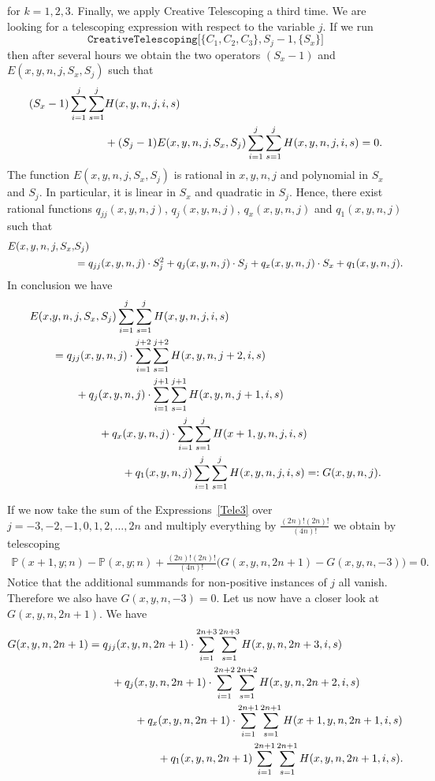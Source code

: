\documentclass{amsart}
\numberwithin{equation}{section}
\begin{document}
for $k=1,2,3$. Finally, we apply Creative Telescoping a third time. We are looking for a telescoping expression with respect to the variable $j$. If we run
\[\texttt{CreativeTelescoping[}\{C_1,C_2,C_3\},S_j-1,\{S_x\}\texttt{]}\]
then after several hours we obtain the two operators $(S_x-1)$ and $E(x,y,n,j,S_x,S_j)$ such that
\begin{align}
    (S_x-1)\sum_{i=1}^j\sum_{s=1}^j &H(x,y,n,j,i,s)\notag\\
    &+(S_j-1)E(x,y,n,j,S_x,S_j)\sum_{i=1}^j\sum_{s=1}^j H(x,y,n,j,i,s)=0. \label{Tele3}
\end{align}
The function $E(x,y,n,j,S_x,S_j)$ is rational in $x,y,n,j$ and polynomial in $S_x$ and $S_j$. In particular, it is linear in $S_x$ and quadratic in $S_j$. Hence, there exist rational functions $q_{jj}(x,y,n,j)$, $q_{j}(x,y,n,j)$, $q_x(x,y,n,j)$ and $q_1(x,y,n,j)$ such that
\begin{align}
    E(x,y,n,j,S_x,&S_j)\notag\\
    &=q_{jj}(x,y,n,j)\cdot S_j^2+q_{j}(x,y,n,j)\cdot S_j+q_{x}(x,y,n,j)\cdot S_x+q_{1}(x,y,n,j).\notag
\end{align}
In conclusion we have
\begin{align}
     E(x,&y,n,j,S_x,S_j)\sum_{i=1}^j\sum_{s=1}^j H(x,y,n,j,i,s)\notag\\
     &=q_{jj}(x,y,n,j)\cdot \sum_{i=1}^{j+2}\sum_{s=1}^{j+2} H(x,y,n,j+2,i,s)\notag\\
     &\hphantom{aaaa}+q_{j}(x,y,n,j)\cdot  \sum_{i=1}^{j+1}\sum_{s=1}^{j+1} H(x,y,n,j+1,i,s)\notag\\
     &\hphantom{aaaaaaaa}+q_{x}(x,y,n,j)\cdot \sum_{i=1}^j\sum_{s=1}^j H(x+1,y,n,j,i,s)\notag\\
     &\hphantom{aaaaaaaaaaaa}+q_1(x,y,n,j)\sum_{i=1}^j\sum_{s=1}^j H(x,y,n,j,i,s)=:G(x,y,n,j)\notag.
\end{align}

If we now take the sum of the Expressions~\eqref{Tele3} over $j=-3,-2,-1,0,1,2,\dots,2n$ and multiply everything by $\frac{(2n)!(2n)!}{(4n)!}$ we obtain by telescoping
\begin{align}
    \mathbb{P}(x+1,y;n)-\mathbb{P}(x,y;n)+\frac{(2n)!(2n)!}{(4n)!}\Big(G(x,y,n,2n+1)-G(x,y,n,-3)\Big)=0. \label{xrec}
\end{align}
Notice that the additional summands for non-positive instances of $j$ all vanish. Therefore we also have $G(x,y,n,-3)=0$.
Let us now have a closer look at $G(x,y,n,2n+1)$. We have
\begin{align}
    G(x,y,n,2n+1)&=q_{jj}(x,y,n,2n+1)\cdot \sum_{i=1}^{2n+3}\sum_{s=1}^{2n+3} H(x,y,n,2n+3,i,s)\notag\\
     &\hphantom{aaaa}+q_{j}(x,y,n,2n+1)\cdot  \sum_{i=1}^{2n+2}\sum_{s=1}^{2n+2} H(x,y,n,2n+2,i,s)\notag\\
     &\hphantom{aaaaaaaa}+q_{x}(x,y,n,2n+1)\cdot \sum_{i=1}^{2n+1}\sum_{s=1}^{2n+1} H(x+1,y,n,{2n+1},i,s)\notag\\
     &\hphantom{aaaaaaaaaaaa}+q_1(x,y,n,2n+1)\sum_{i=1}^{2n+1}\sum_{s=1}^{2n+1} H(x,y,n,{2n+1},i,s).\notag
\end{align}
\end{document}
